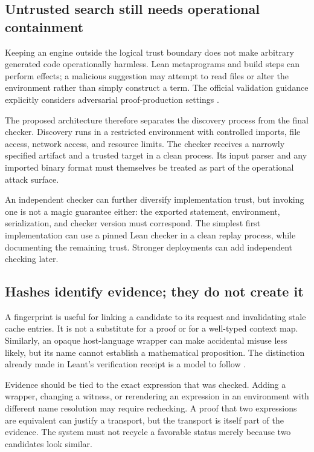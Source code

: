 \documentclass[11pt,letterpaper]{article}
\theoremstyle{remark}
\begin{document}
\subsection{Untrusted search still needs operational containment}

Keeping an engine outside the logical trust boundary does not make arbitrary generated code operationally harmless. Lean metaprograms and build steps can perform effects; a malicious suggestion may attempt to read files or alter the environment rather than simply construct a term. The official validation guidance explicitly considers adversarial proof-production settings \cite{lean-validation}.

The proposed architecture therefore separates the discovery process from the final checker. Discovery runs in a restricted environment with controlled imports, file access, network access, and resource limits. The checker receives a narrowly specified artifact and a trusted target in a clean process. Its input parser and any imported binary format must themselves be treated as part of the operational attack surface.

An independent checker can further diversify implementation trust, but invoking one is not a magic guarantee either: the exported statement, environment, serialization, and checker version must correspond. The simplest first implementation can use a pinned Lean checker in a clean replay process, while documenting the remaining trust. Stronger deployments can add independent checking later.

\subsection{Hashes identify evidence; they do not create it}

A fingerprint is useful for linking a candidate to its request and invalidating stale cache entries. It is not a substitute for a proof or for a well-typed context map. Similarly, an opaque host-language wrapper can make accidental misuse less likely, but its name cannot establish a mathematical proposition. The distinction already made in Leant's verification receipt is a model to follow \cite{leant-verification}.

Evidence should be tied to the exact expression that was checked. Adding a wrapper, changing a witness, or rerendering an expression in an environment with different name resolution may require rechecking. A proof that two expressions are equivalent can justify a transport, but the transport is itself part of the evidence. The system must not recycle a favorable status merely because two candidates look similar.
\end{document}
